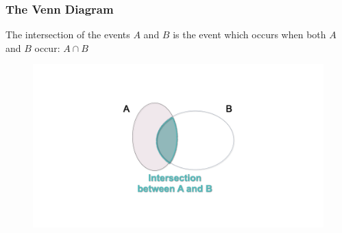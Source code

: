 \documentclass[notes=show]{beamer}\usepackage[]{graphicx}\usepackage[]{color}
\begin{document}
\begin{frame}
\frametitle{The Venn Diagram}

The intersection of the events $A$ and $B$ is the event which occurs when both $A$ and $B$ occur: $A \cap B$\\

\begin{figure}[h!]
\centering
\includegraphics[width=1\textwidth,height=0.7\textheight]{img/charts/charts.006.png}
\end{figure}

%


\end{frame}


%
%
\end{document}
